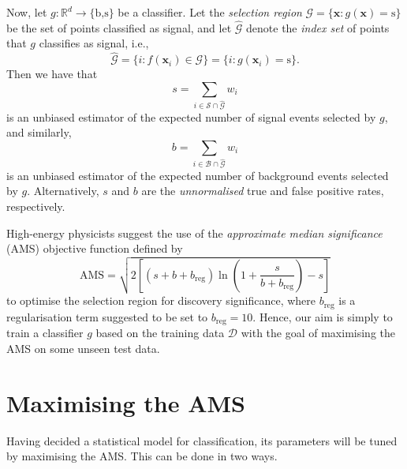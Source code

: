 \documentclass[]{article}
\begin{document}
Now, let $g: \mathbb{R}^d \to \{\text{b,s}\}$ be a classifier. Let the \textit{selection region} $\mathcal{G} = \{\bm{x}: g(\bm{x}) = \text{s}\}$ be the set of points classified as signal, and let $\hat{\mathcal{G}}$ denote the \textit{index set} of points that $g$ classifies as signal, i.e.,
$$ \hat{\mathcal{G}} = \{i:f(\bm{x}_i) \in \mathcal{G}\} = \{i : g(\bm{x}_i) = \text{s}\}. $$
Then we have that
\begin{equation}
\label{s weights}
	s = \sum_{i \in \mathcal{S} \cap \hat{\mathcal{G}}} w_i
\end{equation}
is an unbiased estimator of the expected number of signal events selected by $g$, and similarly,
\begin{equation}
\label{b weights}
b = \sum_{i \in \mathcal{B} \cap \hat{\mathcal{G}}} w_i
\end{equation}
is an unbiased estimator of the expected number of background events selected by $g$. Alternatively, $s$ and $b$ are the \textit{unnormalised} true and false positive rates, respectively.

High-energy physicists suggest the use of the \textit{approximate median significance} (AMS) objective function defined by
\begin{equation}
\label{AMS}
	\text{AMS} = \sqrt{2 \left[ (s + b + b_\text{reg}) \ln \left( 1 + \frac{s}{b + b_\text{reg}} \right) - s \right]}
\end{equation}
to optimise the selection region for discovery significance, where $b_\text{reg}$ is a regularisation term suggested to be set to $b_\text{reg}=10$. Hence, our aim is simply to train a classifier $g$ based on the training data $\mathcal{D}$ with the goal of maximising the AMS on some unseen test data.

\section{Maximising the AMS}

Having decided a statistical model for classification, its parameters will be tuned by maximising the AMS. This can be done in two ways.
\end{document}
